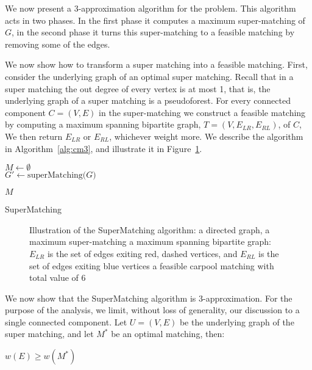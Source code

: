 \label{sub:cm}
We now present a 3-app\-roximation algorithm for the \textsc{\CARPOOL{}} problem.
This algorithm acts in two phases.
In the first phase it computes a maximum super-matching of $G$, 
in the second phase it turns this super-matching to a feasible matching
by removing some of the edges.

We now show how to transform a super matching into a feasible matching.
First, consider the underlying graph of an optimal super matching.
Recall that in a super matching the out degree of every vertex is at most 1,
that is, the underlying graph of a super matching is a pseudoforest.
For every connected component $C = (V, E)$ 
in the super-matching we construct a feasible matching by
computing a maximum spanning bipartite graph, $T = (V, E_{LR}, E_{RL})$, of $C$, 
We then return $E_{LR}$ or $E_{RL}$, whichever weight more. 
We describe the algorithm in Algorithm~\ref{alg:cm3}, 
and illustrate it in Figure~\ref{fig:spanning-bipartite-graph}.   

\begin{algorithm}[t]

$M \leftarrow \emptyset$								\\
$G' \leftarrow \text{superMatching($G$)}$				\\


\Return $M$
\caption{
\label{alg:cm3}
SuperMatching}
\end{algorithm}

\begin{figure}
\centering

\caption[]{
\label{fig:spanning-bipartite-graph}
Illustration of the SuperMatching algorithm:
 a directed graph, 
 a maximum super-matching  
 a maximum spanning bipartite graph:
$E_{LR}$ is the set of edges exiting red, dashed vertices, 
and $E_{RL}$ is the set of edges exiting blue vertices
 a feasible carpool matching with total value of 6   
}
\end{figure}

We now show that the SuperMatching algorithm is 3-approximation.
For the purpose of the analysis, we limit, without loss of generality, 
our discussion to a single connected component.
Let $U = (V, E)$ be the underlying graph of the super matching, 
and let $M^*$ be an optimal matching, then:
\begin{lemma}
\label{lm:super-geq-m^*}
$w(E) \geq w(M^*)$
\end{lemma}

